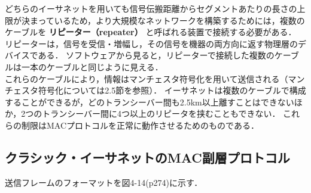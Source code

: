 \documentclass[a4paper]{ltjsarticle}
\begin{document}
どちらのイーサネットを用いても信号伝搬距離からセグメントあたりの長さの上限が決まっているため，より大規模なネットワークを構築するためには，複数のケーブルを
\textbf{リピーター（repeater）} と呼ばれる装置で接続する必要がある．
リピーターは，信号を受信・増幅し，その信号を機器の両方向に返す物理層のデバイスである．
ソフトウェアから見ると，リピーターで接続した複数のケーブルは一本のケーブルと同じように見える．\\
これらのケーブルにより，情報はマンチェスタ符号化を用いて送信される（マンチェスタ符号化については2.5節を参照）．
イーサネットは複数のケーブルで構成することができるが，どのトランシーバー間も2.5km以上離すことはできないほか，2つのトランシーバー間に4つ以上のリピータを挟むこともできない．
これらの制限はMACプロトコルを正常に動作させるためのものである．

\subsection{クラシック・イーサネットのMAC副層プロトコル}\label{ux30afux30e9ux30b7ux30c3ux30afux30a4ux30fcux30b5ux30cdux30c3ux30c8ux306emacux526fux5c64ux30d7ux30edux30c8ux30b3ux30eb}

送信フレームのフォーマットを図4-14(p274)に示す．
\end{document}
